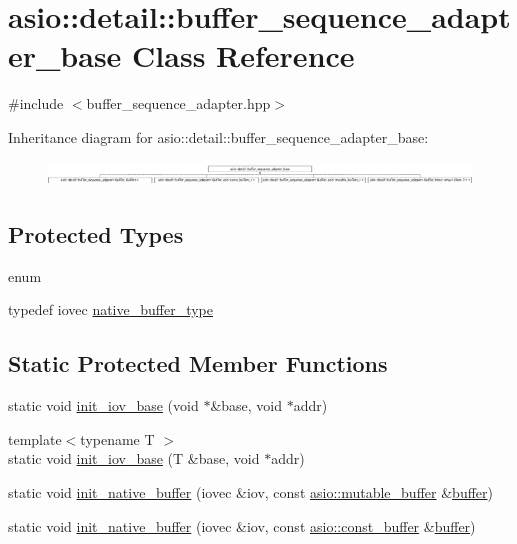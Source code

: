 \hypertarget{classasio_1_1detail_1_1buffer__sequence__adapter__base}{}\section{asio\+:\+:detail\+:\+:buffer\+\_\+sequence\+\_\+adapter\+\_\+base Class Reference}
\label{classasio_1_1detail_1_1buffer__sequence__adapter__base}


{\ttfamily \#include $<$buffer\+\_\+sequence\+\_\+adapter.\+hpp$>$}

Inheritance diagram for asio\+:\+:detail\+:\+:buffer\+\_\+sequence\+\_\+adapter\+\_\+base\+:\begin{figure}[H]
\begin{center}
\leavevmode
\includegraphics[height=0.648148cm]{classasio_1_1detail_1_1buffer__sequence__adapter__base}
\end{center}
\end{figure}
\subsection*{Protected Types}
\begin{DoxyCompactItemize}
\item 
enum 
\item 
typedef iovec \hyperlink{classasio_1_1detail_1_1buffer__sequence__adapter__base_a91d037bd052777b8df514e6b94ec9e71}{native\+\_\+buffer\+\_\+type}
\end{DoxyCompactItemize}
\subsection*{Static Protected Member Functions}
\begin{DoxyCompactItemize}
\item 
static void \hyperlink{classasio_1_1detail_1_1buffer__sequence__adapter__base_a7fb7b0ec258640205812c8e63fe4b334}{init\+\_\+iov\+\_\+base} (void $\ast$\&base, void $\ast$addr)
\item 
{\footnotesize template$<$typename T $>$ }\\static void \hyperlink{classasio_1_1detail_1_1buffer__sequence__adapter__base_a1791d2dfb509ba5c3202625e4462aa81}{init\+\_\+iov\+\_\+base} (T \&base, void $\ast$addr)
\item 
static void \hyperlink{classasio_1_1detail_1_1buffer__sequence__adapter__base_aacb19d9f1ddf93bfc18f64352b67726d}{init\+\_\+native\+\_\+buffer} (iovec \&iov, const \hyperlink{classasio_1_1mutable__buffer}{asio\+::mutable\+\_\+buffer} \&\hyperlink{group__buffer_ga1ed66e401559cbfd19595392f653b47c}{buffer})
\item 
static void \hyperlink{classasio_1_1detail_1_1buffer__sequence__adapter__base_a5122ae3238570a50367716e41d572787}{init\+\_\+native\+\_\+buffer} (iovec \&iov, const \hyperlink{classasio_1_1const__buffer}{asio\+::const\+\_\+buffer} \&\hyperlink{group__buffer_ga1ed66e401559cbfd19595392f653b47c}{buffer})
\end{DoxyCompactItemize}


